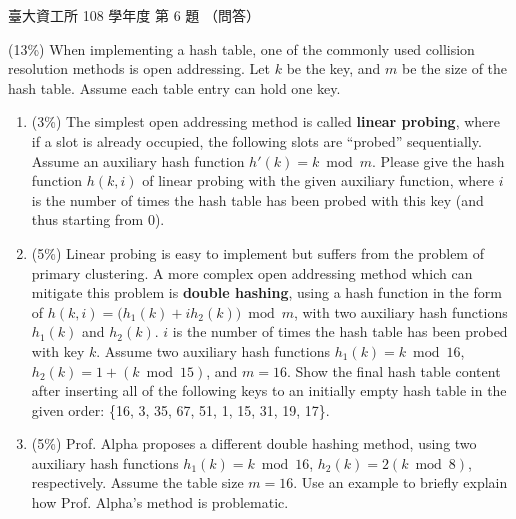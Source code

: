 \begin{pastexam}[label={px:ntu-108-dsaa-06}]{臺大資工所 108 學年度 第 6 題}
（問答）

(13\%) When implementing a hash table, one of the commonly used collision resolution methods is
open addressing. Let $k$ be the key, and $m$ be the size of the hash table. Assume each table entry
can hold one key.
\begin{enumerate}[label=(\alph*)]
\item (3\%) The simplest open addressing method is called \textbf{linear probing}, where if a slot
is already occupied, the following slots are ``probed'' sequentially. Assume an auxiliary hash
function $h'(k)=k \bmod m$. Please give the hash function $h(k,i)$ of linear probing with the given
auxiliary function, where $i$ is the number of times the hash table has been probed with this key
(and thus starting from 0).
\item (5\%) Linear probing is easy to implement but suffers from the problem of primary
clustering. A more complex open addressing method which can mitigate this problem is
\textbf{double hashing}, using a hash function in the form of
$h(k,i)=\big(h_1(k)+ih_2(k)\big) \bmod m$, with two auxiliary hash functions $h_1(k)$ and
$h_2(k)$. $i$ is the number of times the hash table has been probed with key $k$. Assume two
auxiliary hash functions $h_1(k)=k \bmod 16$, $h_2(k)=1+(k \bmod 15)$, and $m=16$. Show the final
hash table content after inserting all of the following keys to an initially empty hash table in
the given order: \{16, 3, 35, 67, 51, 1, 15, 31, 19, 17\}.
\item (5\%) Prof. Alpha proposes a different double hashing method, using two auxiliary hash
functions $h_1(k)=k \bmod 16$, $h_2(k)=2(k \bmod 8)$, respectively. Assume the table size $m=16$.
Use an example to briefly explain how Prof. Alpha's method is problematic.
\end{enumerate}
\end{pastexam}

